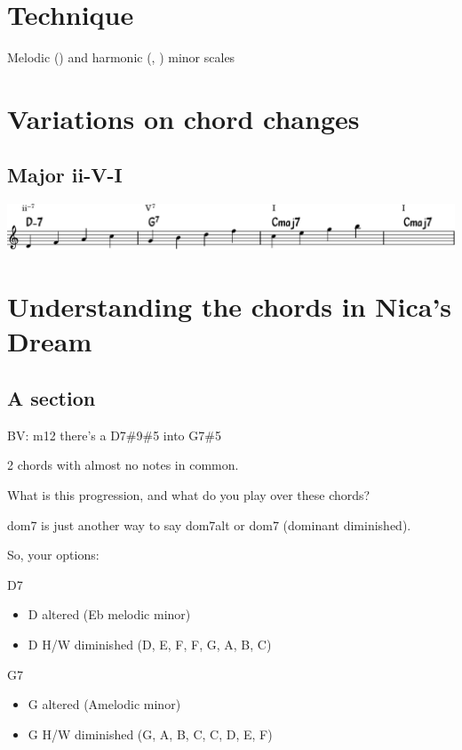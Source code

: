 \documentclass[11pt]{article}
\begin{document}
\section{Technique}
\label{sec:orgb4c416f}
Melodic () and harmonic (, ) minor scales
\section{Variations on chord changes}
\label{sec:orga94e8d1}

\subsection{Major ii-V-I}
\label{sec:org98d0689}
\begin{center}
\includegraphics[width=.98\linewidth]{major_ii_v_i.pdf}
\end{center}

\section{Understanding the chords in Nica’s Dream}
\label{sec:org7f07a11}

\subsection{A section}
\label{sec:org0c12c49}

BV: m12 there’s a D7\#9\#5 into G7\#5

2 chords with almost no notes in common.

What is this progression, and what do you play over these chords?


dom7 is just another way to say dom7alt or dom7 (dominant diminished).

So, your options:

D7
\begin{itemize}
\item D altered (Eb melodic minor)
\item D H/W diminished (D, E\flat,  F, F\sharp,  G\sharp,  A, B, C)
\end{itemize}

G7
\begin{itemize}
\item G altered (A\flat   melodic minor)
\item G H/W diminished (G, A, B\flat, C, C\sharp, D\sharp, E, F\sharp)
\end{itemize}
\end{document}
